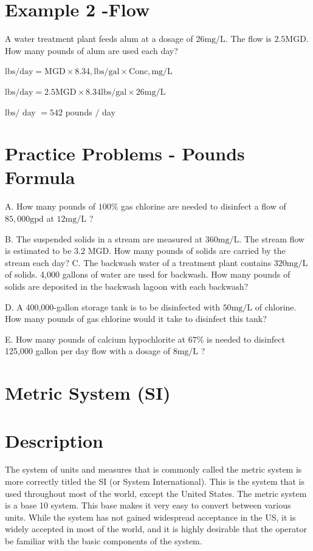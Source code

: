 \documentclass[10pt]{article}
\begin{document}
\section{Example 2 -Flow}
A water treatment plant feeds alum at a dosage of $26 \mathrm{mg} / \mathrm{L}$. The flow is $2.5 \mathrm{MGD}$. How many pounds of alum are used each day?

$\mathrm{lbs} / \mathrm{day}=\mathrm{MGD} \times 8.34, \mathrm{lbs} / \mathrm{gal} \times \mathrm{Conc}, \mathrm{mg} / \mathrm{L}$

$\mathrm{lbs} / \mathrm{day}=2.5 \mathrm{MGD} \times 8.34 \mathrm{lbs} / \mathrm{gal} \times 26 \mathrm{mg} / \mathrm{L}$

$\mathrm{lbs} /$ day $=542$ pounds $/$ day

\section{Practice Problems - Pounds Formula}
A. How many pounds of $100 \%$ gas chlorine are needed to disinfect a flow of $85,000 \mathrm{gpd}$ at $12 \mathrm{mg} / \mathrm{L}$ ?

B. The suspended solids in a stream are measured at $360 \mathrm{mg} / \mathrm{L}$. The stream flow is estimated to be $3.2$ MGD. How many pounds of solids are carried by the stream each day? C. The backwash water of a treatment plant contains $320 \mathrm{mg} / \mathrm{L}$ of solids. 4,000 gallons of water are used for backwash. How many pounds of solids are deposited in the backwash lagoon with each backwash?

D. A 400,000-gallon storage tank is to be disinfected with $50 \mathrm{mg} / \mathrm{L}$ of chlorine. How many pounds of gas chlorine would it take to disinfect this tank?

E. How many pounds of calcium hypochlorite at $67 \%$ is needed to disinfect 125,000 gallon per day flow with a dosage of $8 \mathrm{mg} / \mathrm{L}$ ?

\section{Metric System (SI)}
\section{Description}
The system of units and measures that is commonly called the metric system is more correctly titled the SI (or System International). This is the system that is used throughout most of the world, except the United States. The metric system is a base 10 system. This base makes it very easy to convert between various units. While the system has not gained widespread acceptance in the US, it is widely accepted in most of the world, and it is highly desirable that the operator be familiar with the basic components of the system.
\end{document}
